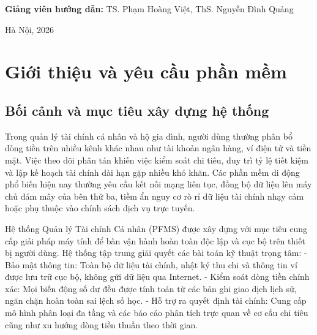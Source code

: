 \documentclass[a4paper,12pt]{report}
\begin{document}
\begin{titlepage}
\begin{center}
\vspace{0.8cm}

{\large\textbf{Giảng viên hướng dẫn:} TS. Phạm Hoàng Việt, ThS. Nguyễn Đình Quảng}

\vfill

{\large Hà Nội, 2026}

\end{center}
\end{titlepage}

\newpage
\begingroup
\setlength{\parskip}{0pt}
\linespread{1.0}\selectfont
\tableofcontents
\endgroup
\newpage

\chapter{Giới thiệu và yêu cầu phần
mềm}\label{giux1edbi-thiux1ec7u-vuxe0-yuxeau-cux1ea7u-phux1ea7n-mux1ec1m}

\section{Bối cảnh và mục tiêu xây dựng hệ
thống}\label{bux1ed1i-cux1ea3nh-vuxe0-mux1ee5c-tiuxeau-xuxe2y-dux1ef1ng-hux1ec7-thux1ed1ng}

Trong quản lý tài chính cá nhân và hộ gia đình, người dùng thường phân
bổ dòng tiền trên nhiều kênh khác nhau như tài khoản ngân hàng, ví điện
tử và tiền mặt. Việc theo dõi phân tán khiến việc kiểm soát chi tiêu,
duy trì tỷ lệ tiết kiệm và lập kế hoạch tài chính dài hạn gặp nhiều khó
khăn. Các phần mềm di động phổ biến hiện nay thường yêu cầu kết nối mạng
liên tục, đồng bộ dữ liệu lên máy chủ đám mây của bên thứ ba, tiềm ẩn
nguy cơ rò rỉ dữ liệu tài chính nhạy cảm hoặc phụ thuộc vào chính sách
dịch vụ trực tuyến.

Hệ thống Quản lý Tài chính Cá nhân (PFMS) được xây dựng với mục tiêu
cung cấp giải pháp máy tính để bàn vận hành hoàn toàn độc lập và cục bộ
trên thiết bị người dùng. Hệ thống tập trung giải quyết các bài toán kỹ
thuật trọng tâm: - Bảo mật thông tin: Toàn bộ dữ liệu tài chính, nhật ký
thu chi và thông tin ví được lưu trữ cục bộ, không gửi dữ liệu qua
Internet. - Kiểm soát dòng tiền chính xác: Mọi biến động số dư đều được
tính toán từ các bản ghi giao dịch lịch sử, ngăn chặn hoàn toàn sai lệch
số học. - Hỗ trợ ra quyết định tài chính: Cung cấp mô hình phân loại đa
tầng và các báo cáo phân tích trực quan về cơ cấu chi tiêu cũng như xu
hướng dòng tiền thuần theo thời gian.
\end{document}

